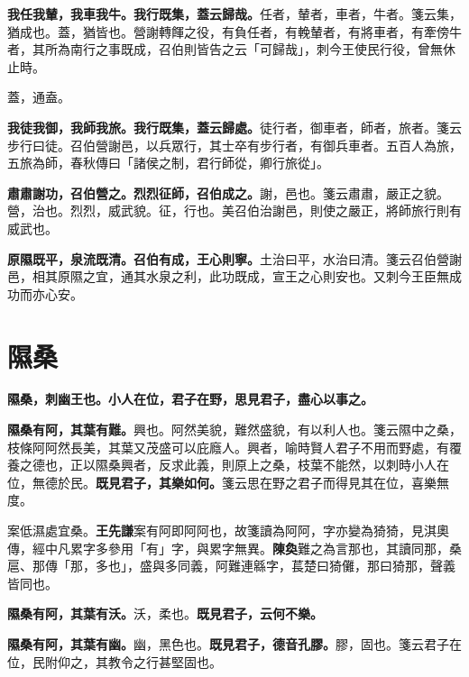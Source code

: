\textbf{我任我輦，我車我牛。我行既集，蓋云歸哉。}{\footnotesize 任者，輦者，車者，牛者。箋云集，猶成也。蓋，猶皆也。營謝轉餫之役，有負任者，有輓輦者，有將車者，有牽傍牛者，其所為南行之事既成，召伯則皆告之云「可歸哉」，刺今王使民行役，曾無休止時。}

\begin{quoting}蓋，通盍。\end{quoting}

\textbf{我徒我御，我師我旅。我行既集，蓋云歸處。}{\footnotesize 徒行者，御車者，師者，旅者。箋云步行曰徒。召伯營謝邑，以兵眾行，其士卒有步行者，有御兵車者。五百人為旅，五旅為師，春秋傳曰「諸侯之制，君行師從，卿行旅從」。}

\textbf{肅肅謝功，召伯營之。烈烈征師，召伯成之。}{\footnotesize 謝，邑也。箋云肅肅，嚴正之貌。營，治也。烈烈，威武貌。征，行也。美召伯治謝邑，則使之嚴正，將師旅行則有威武也。}

\textbf{原隰既平，泉流既清。召伯有成，王心則寧。}{\footnotesize 土治曰平，水治曰清。箋云召伯營謝邑，相其原隰之宜，通其水泉之利，此功既成，宣王之心則安也。又刺今王臣無成功而亦心安。}

\section{隰桑}


\textbf{隰桑，刺幽王也。小人在位，君子在野，思見君子，盡心以事之。}

\textbf{隰桑有阿，其葉有難。}{\footnotesize 興也。阿然美貌，難然盛貌，有以利人也。箋云隰中之桑，枝條阿阿然長美，其葉又茂盛可以庇廕人。興者，喻時賢人君子不用而野處，有覆養之德也，正以隰桑興者，反求此義，則原上之桑，枝葉不能然，以刺時小人在位，無德於民。}\textbf{既見君子，其樂如何。}{\footnotesize 箋云思在野之君子而得見其在位，喜樂無度。}

\begin{quoting}案低濕處宜桑。\textbf{王先謙}案有阿即阿阿也，故箋讀為阿阿，字亦變為猗猗，見淇奧傳，經中凡累字多參用「有」字，與累字無異。\textbf{陳奐}難之為言那也，其讀同那，桑扈、那傳「那，多也」，盛與多同義，阿難連緜字，萇楚曰猗儺，那曰猗那，聲義皆同也。\end{quoting}

\textbf{隰桑有阿，其葉有沃。}{\footnotesize 沃，柔也。}\textbf{既見君子，云何不樂。}

\textbf{隰桑有阿，其葉有幽。}{\footnotesize 幽，黑色也。}\textbf{既見君子，德音孔膠。}{\footnotesize 膠，固也。箋云君子在位，民附仰之，其教令之行甚堅固也。}

